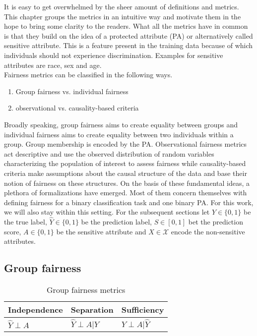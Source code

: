 It is easy to get overwhelmed by the sheer amount of definitions and metrics. This chapter groups the metrics in an intuitive way and motivate them in the hope to bring some clarity to the readers. What all the metrics have in common is that they build on the idea of a protected attribute (PA) or alternatively called sensitive attribute. This is a feature present in the training data because of which individuals should not experience discrimination. Examples for sensitive attributes are race, sex and age. \\
Fairness metrics can be classified in the following ways.
\begin{enumerate}
    \item Group fairness vs. individual fairness
    \item observational vs. causality-based criteria
\end{enumerate}

Broadly speaking, group fairness aims to create equality between groups and individual fairness aims to create equality between two individuals within a group. Group membership is encoded by the PA. Observational fairness metrics act descriptive and use the observed distribution of random variables characterizing the population of interest to assess fairness while causality-based criteria make assumptions about the causal structure of the data and base their notion of fairness on these structures.
On the basis of these fundamental ideas, a plethora of formalizations have emerged. Most of them concern themselves with defining fairness for a binary classification task and one binary PA. For this work, we will also stay within this setting. For the subsequent sections let $Y \in \{0, 1\}$ be the true label, $\hat{Y} \in \{0, 1\}$ be the prediction label, $S \in [0,1]$ bet the prediction score, $A \in \{0, 1\}$ be the sensitive attribute and $X \in \mathcal{X}$ encode the non-sensitive attributes.

\subsection{Group fairness}
\begin{table}
    \centering
    \begin{tabular}{lll}
        \toprule
        Independence & Separation & {Sufficiency} \\
        \midrule
        $\hat{Y} \perp A$ & $\hat{Y} \perp A | Y$ & {$Y \perp A | \hat{Y}$}\\
        \bottomrule
    \end{tabular}
    \caption{Group fairness metrics}
    \label{tab:group_fairness}
\end{table}

